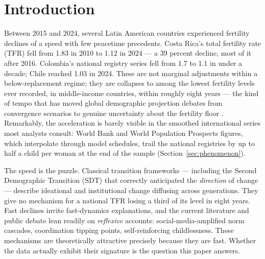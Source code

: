 \section{Introduction}
\label{sec:intro}

Between 2015 and 2024, several Latin American countries experienced fertility
declines of a speed with few peacetime precedents. Costa Rica's total fertility
rate (TFR) fell from 1.83 in 2010 to 1.12 in 2024 --- a 39 percent decline, most
of it after 2016. Colombia's national registry series fell from 1.7 to 1.1 in
under a decade; Chile reached 1.03 in 2024. These are not marginal adjustments
within a below-replacement regime; they are collapses to among the lowest
fertility levels ever recorded, in middle-income countries, within roughly
eight years --- the kind of tempo that has moved global demographic
projection debates from convergence scenarios to genuine uncertainty about
the fertility floor \citep{fernandezvillaverde2026}. Remarkably, the acceleration is barely visible in the smoothed
international series most analysts consult: World Bank and World Population
Prospects figures, which interpolate through model schedules, trail the national
registries by up to half a child per woman at the end of the sample
(Section~\ref{sec:phenomenon}).

The speed is the puzzle. Classical transition frameworks --- including the Second
Demographic Transition (SDT) that correctly anticipated the \emph{direction} of
change \citep{lesthaeghe1986twee, vandekaa1987, lesthaeghe2010} --- describe
ideational and institutional change diffusing across generations. They give no
mechanism for a national TFR losing a third of its level in eight years. Fast
declines invite fast-dynamics explanations, and the current literature and public
debate lean readily on \emph{reflexive} accounts: social-media-amplified norm
cascades, coordination tipping points, self-reinforcing childlessness. These
mechanisms are theoretically attractive precisely because they are fast. Whether
the data actually exhibit their signature is the question this paper answers.

